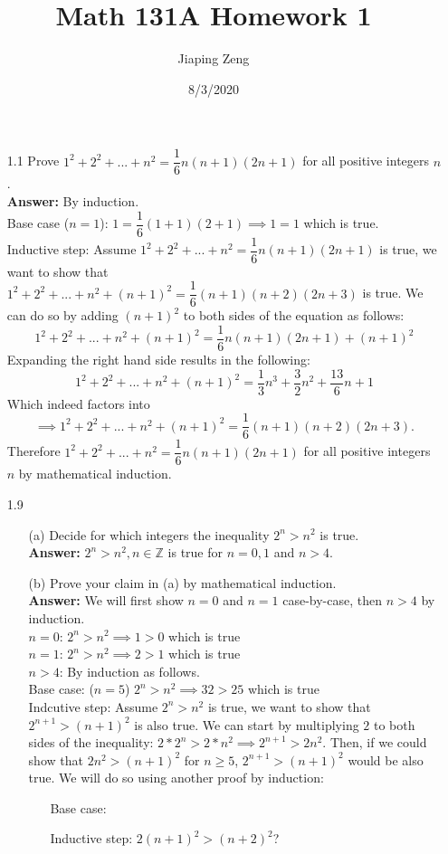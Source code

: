 \documentclass{article}
\title{Math 131A Homework 1}
\date{8/3/2020}
\author{Jiaping Zeng}
\begin{document}
\maketitle

\begin{itemize}
      \item [1.1] Prove $1^2+2^2+...+n^2=\dfrac{1}{6}n(n+1)(2n+1)$ for all positive integers $n$.\\\textbf{Answer: } By induction. \\
            Base case ($n=1$): $1=\dfrac{1}{6}(1+1)(2+1)\implies1=1$ which is true. \\
            Inductive step: Assume $1^2+2^2+...+n^2=\dfrac{1}{6}n(n+1)(2n+1)$ is true, we want to show that $1^2+2^2+...+n^2+(n+1)^2=\dfrac{1}{6}(n+1)(n+2)(2n+3)$ is true. We can do so by adding $(n+1)^2$ to both sides of the equation as follows:
            \[1^2+2^2+...+n^2+(n+1)^2=\dfrac{1}{6}n(n+1)(2n+1)+(n+1)^2\]
            Expanding the right hand side results in the following:
            \[1^2+2^2+...+n^2+(n+1)^2=\dfrac{1}{3}n^3+\dfrac{3}{2}n^2+\dfrac{13}{6}n+1\]
            Which indeed factors into
            \[\implies1^2+2^2+...+n^2+(n+1)^2=\dfrac{1}{6}(n+1)(n+2)(2n+3).\]
            Therefore $1^2+2^2+...+n^2=\dfrac{1}{6}n(n+1)(2n+1)$ for all positive integers $n$ by mathematical induction.
      \item [1.9]
            \begin{itemize}
                  \item [(a)] Decide for which integers the inequality $2^n>n^2$ is true.\\
                  \textbf{Answer: } $2^n>n^2, n\in\mathbb{Z}$ is true for $n=0,1$ and $n>4$.
                  \item [(b)] Prove your claim in (a) by mathematical induction.\\
                  \textbf{Answer: } We will first show $n=0$ and $n=1$ case-by-case, then $n>4$ by induction.\\
                  $n=0$: $2^n>n^2\implies 1>0$ which is true\\
                  $n=1$: $2^n>n^2\implies 2>1$ which is true\\
                  $n>4$: By induction as follows.\\
                  Base case: ($n=5$) $2^n>n^2\implies 32>25$ which is true\\
                  Indcutive step: Assume $2^n>n^2$ is true, we want to show that $2^{n+1}>(n+1)^2$ is also true. We can start by multiplying $2$ to both sides of the inequality: $2*2^n>2*n^2\implies 2^{n+1}>2n^2$. Then, if we could show that $2n^2>(n+1)^2$ for $n\geq 5$, $2^{n+1}>(n+1)^2$ would be also true. We will do so using another proof by induction: \begin{itemize}
                        \item [] Base case: 
                        \item [] Inductive step: $2(n+1)^2>(n+2)^2$? $$
                  \end{itemize}


\end{itemize}
\end{itemize}
\end{document}
